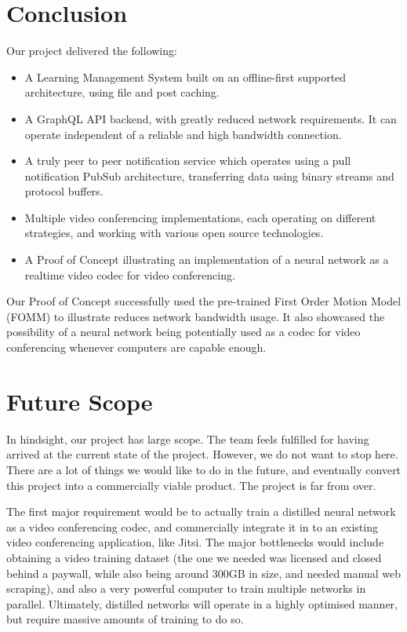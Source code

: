 \section{Conclusion}
Our project delivered the following:
\begin{itemize}
    \item A Learning Management System built on an offline-first supported architecture, using file and post caching.
    \item A GraphQL API backend, with greatly reduced network requirements. It can operate independent of a reliable 
    and high bandwidth connection.
    \item A truly peer to peer notification service which operates using a pull notification PubSub architecture, 
    transferring data using binary streams and protocol buffers.
    \item Multiple video conferencing implementations, each operating on different strategies, 
    and working with various open source technologies.
    \item A Proof of Concept illustrating an implementation of a neural network as a realtime video codec for video conferencing.
\end{itemize}

Our Proof of Concept successfully used the pre-trained First Order Motion Model (FOMM) to illustrate reduces
network bandwidth usage. It also showcased the possibility of a neural network being potentially used as a codec 
for video conferencing whenever computers are capable enough.

\section{Future Scope}
In hindsight, our project has large scope. The team feels fulfilled for having arrived at the current state of the project. 
However, we do not want to stop here. There are a lot of things we would like to do in the future, and eventually convert this 
project into a commercially viable product. The project is far from over.

The first major requirement would be to actually train a distilled neural network as a video conferencing codec, and commercially 
integrate it in to an existing video conferencing application, like Jitsi. The major bottlenecks would include obtaining a video training dataset 
(the one we needed was licensed and closed behind a paywall, while also being around 300GB in size, and needed manual web scraping), and also a very powerful computer to train multiple networks in parallel. 
Ultimately, distilled networks will operate in a highly optimised manner, but require massive amounts of training to do so.

